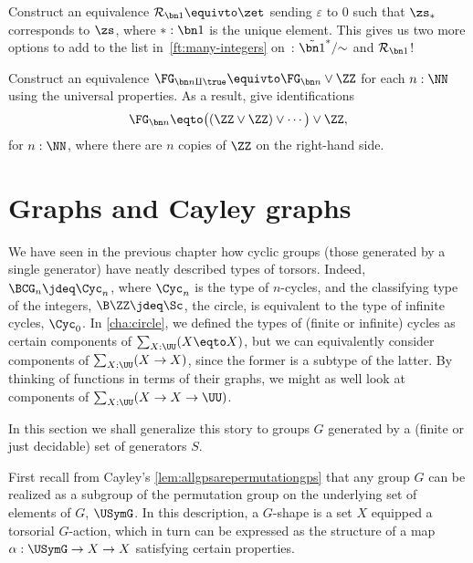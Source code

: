 \begin{xca}
  Construct an equivalence $\mathcal R_{\bn 1} \equivto \zet$
  sending $\varepsilon$ to $0$ such that $\zs_*$ corresponds to $\zs$,
  where $*:\bn 1$ is the unique element.
  This gives us two more options to add to the list in~\cref{ft:many-integers}
  on~: $\tilde{\bn 1}^*/{\sim}$ and $\mathcal R_{\bn 1}$!
\end{xca}

\begin{xca}
  Construct an equivalence $\FG_{\bn n \amalg \true} \equivto \FG_{\bn n}
  \vee \ZZ$ for each $n : \NN$ using the universal properties.
  As a result, give identifications
  \[
    \FG_{\bn n} \eqto \bigl((\ZZ \vee \ZZ) \vee \cdots\bigr) \vee \ZZ,
  \]
  for $n:\NN$, where there are $n$ copies of $\ZZ$ on the right-hand side.
\end{xca}

\section{Graphs and Cayley graphs}
\label{sec:cayley-graphs}

We have seen in the previous chapter how cyclic groups
(those generated by a single generator)
have neatly described types of torsors.
Indeed, $\BCG_n \jdeq \Cyc_n$, where $\Cyc_n$ is the type of $n$-cycles,
and the classifying type of the integers, $\B\ZZ\jdeq\Sc$, \ie the circle,
is equivalent to the type of infinite cycles, $\Cyc_0$.
In \cref{cha:circle}, we defined the types of (finite or infinite)
cycles as certain components of $\sum_{X:\UU}(X\eqto X)$,
but we can equivalently consider components of $\sum_{X:\UU}(X\to X)$,
since the former is a subtype of the latter.
By thinking of functions in terms of their graphs,
we might as well look at components of $\sum_{X:\UU}(X \to X \to \UU)$.

In this section we shall generalize this story
to groups $G$ generated by a
(finite or just decidable)
set of generators $S$.

First recall from Cayley's \cref{lem:allgpsarepermutationgps}
that any group $G$ can be realized as a subgroup of the permutation group
on the underlying set of elements of $G$, $\USymG$.
In this description, a $G$-shape is a set $X$ equipped a torsorial $G$-action,
which in turn can be expressed as the structure of a map $\alpha:\USymG \to X \to X$
satisfying certain properties.

